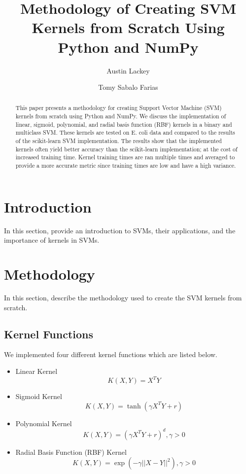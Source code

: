 \documentclass[12pt]{article}
\title{Methodology of Creating SVM Kernels from Scratch Using Python and NumPy}
\author{Austin Lackey}
\author{Tomy Sabalo Farias}
\affil{DSCI 320, Colorado State University}
\begin{document}
\maketitle

\begin{abstract}
This paper presents a methodology for creating Support Vector Machine (SVM) kernels from scratch using Python and NumPy. 
We discuss the implementation of linear, sigmoid, polynomial, and radial basis function (RBF) kernels in a binary and multiclass SVM.
These kernels are tested on E. coli data and compared to the results of the scikit-learn SVM implementation.
The results show that the implemented kernels often yield better accuracy than the scikit-learn implementation; at the
cost of increased training time. Kernel training times are ran multiple times and averaged to provide a more accurate
metric since training times are low and have a high variance.
\end{abstract}

\section{Introduction}
In this section, provide an introduction to SVMs, their applications, and the importance of kernels in SVMs.

\section{Methodology}
In this section, describe the methodology used to create the SVM kernels from scratch.
\subsection{Kernel Functions}
We implemented four different kernel functions which are listed below.
\begin{itemize}
    \item Linear Kernel
    \begin{equation}
    K(X, Y) = X^T Y
    \end{equation}
    
    \item Sigmoid Kernel
    \begin{equation}
    K(X, Y) = \tanh(\gamma X^T Y + r)
    \end{equation}
    
    \item Polynomial Kernel
    \begin{equation}
    K(X, Y) = (\gamma X^T Y + r)^d, \gamma > 0
    \end{equation}
    
    \item Radial Basis Function (RBF) Kernel
    \begin{equation}
    K(X, Y) = \exp(-\gamma ||X - Y||^2), \gamma > 0
    \end{equation}
\end{itemize}
\end{document}
